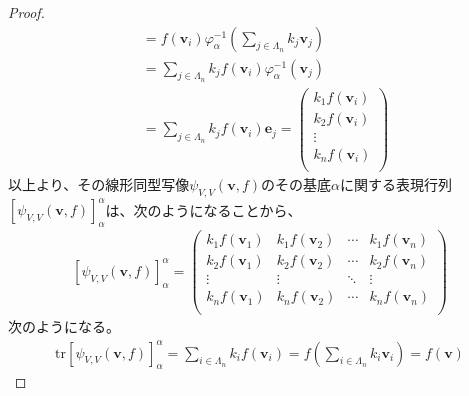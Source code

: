 \documentclass[dvipdfmx]{jsarticle}
\begin{document}
\begin{proof}
\begin{align*}
&= f\left( \mathbf{v}_{i} \right)\varphi_{\alpha}^{- 1}\left( \sum_{j \in \varLambda_{n}} {k_{j}\mathbf{v}_{j}} \right)\\
&= \sum_{j \in \varLambda_{n}} {k_{j}f\left( \mathbf{v}_{i} \right)\varphi_{\alpha}^{- 1}\left( \mathbf{v}_{j} \right)}\\
&= \sum_{j \in \varLambda_{n}} {k_{j}f\left( \mathbf{v}_{i} \right)\mathbf{e}_{j}} = \begin{pmatrix}
k_{1}f\left( \mathbf{v}_{i} \right) \\
k_{2}f\left( \mathbf{v}_{i} \right) \\
 \vdots \\
k_{n}f\left( \mathbf{v}_{i} \right) \\
\end{pmatrix}
\end{align*}
以上より、その線形同型写像$\psi_{V,V}\left( \mathbf{v},f \right)$のその基底$\alpha$に関する表現行列$\left[ \psi_{V,V}\left( \mathbf{v},f \right) \right]_{\alpha}^{\alpha}$は、次のようになることから、
\begin{align*}
\left[ \psi_{V,V}\left( \mathbf{v},f \right) \right]_{\alpha}^{\alpha} = \begin{pmatrix}
k_{1}f\left( \mathbf{v}_{1} \right) & k_{1}f\left( \mathbf{v}_{2} \right) & \cdots & k_{1}f\left( \mathbf{v}_{n} \right) \\
k_{2}f\left( \mathbf{v}_{1} \right) & k_{2}f\left( \mathbf{v}_{2} \right) & \cdots & k_{2}f\left( \mathbf{v}_{n} \right) \\
 \vdots & \vdots & \ddots & \vdots \\
k_{n}f\left( \mathbf{v}_{1} \right) & k_{n}f\left( \mathbf{v}_{2} \right) & \cdots & k_{n}f\left( \mathbf{v}_{n} \right) \\
\end{pmatrix}
\end{align*}
次のようになる。
\begin{align*}
\mathrm{tr}\left[ \psi_{V,V}\left( \mathbf{v},f \right) \right]_{\alpha}^{\alpha} = \sum_{i \in \varLambda_{n}} {k_{i}f\left( \mathbf{v}_{i} \right)} = f\left( \sum_{i \in \varLambda_{n}} {k_{i}\mathbf{v}_{i}} \right) = f\left( \mathbf{v} \right)
\end{align*}
\end{proof}
\end{document}
